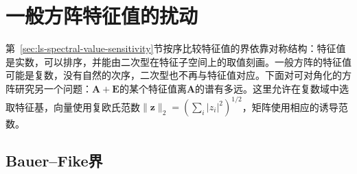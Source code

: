 
\section{一般方阵特征值的扰动}
\label{sec:ls-nonnormal-spectral-sensitivity}

第~\ref{sec:ls-spectral-value-sensitivity}节按序比较特征值的界依靠对称结构：特征值是实数，可以排序，并能由二次型在特征子空间上的取值刻画。一般方阵的特征值可能是复数，没有自然的次序，二次型也不再与特征值对应。下面对可对角化的方阵研究另一个问题：$\bm A+\bm E$的某个特征值离$\bm A$的谱有多远。这里允许在复数域中选取特征基，向量使用复欧氏范数$\lVert\bm z\rVert_2=(\sum_i|z_i|^2)^{1/2}$，矩阵使用相应的诱导范数。

\subsection{Bauer--Fike界}

